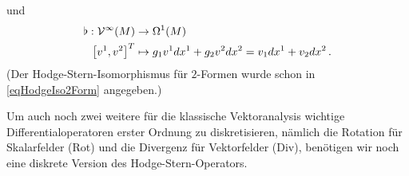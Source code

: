   und
  \begin{align}
    \begin{aligned}
      \flat: \mathcal{V}^{\infty}(M) &\rightarrow \Omega^{1}(M) \\
             \left[ v^{1}, v^{2} \right]^{T} &\mapsto g_{1}v^{1} dx^{1} + g_{2}v^{2} dx^{2} = v_{1} dx^{1} + v_{2} dx^{2} \,\text{.}
    \end{aligned}
  \end{align}
  (Der Hodge-Stern-Isomorphismus für \( 2 \)-Formen wurde schon in \eqref{eqHodgeIso2Form} angegeben.)
  
  Um auch noch zwei weitere für die klassische Vektoranalysis wichtige Differentialoperatoren erster Ordnung zu diskretisieren,
  nämlich die Rotation für Skalarfelder (Rot) und die Divergenz für Vektorfelder (Div), 
  benötigen wir noch eine diskrete Version des Hodge-Stern-Operators.
 


